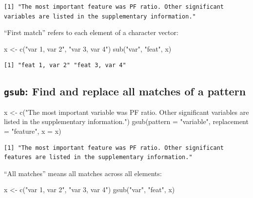 \documentclass[
]{book}
\newenvironment{Shaded}{\begin{snugshade}}{\end{snugshade}}
\newcommand{\AttributeTok}[1]{\textcolor[rgb]{0.77,0.63,0.00}{#1}}
\newcommand{\FunctionTok}[1]{\textcolor[rgb]{0.00,0.00,0.00}{#1}}
\newcommand{\NormalTok}[1]{#1}
\newcommand{\OtherTok}[1]{\textcolor[rgb]{0.56,0.35,0.01}{#1}}
\newcommand{\StringTok}[1]{\textcolor[rgb]{0.31,0.60,0.02}{#1}}
\begin{document}
\begin{verbatim}
[1] "The most important feature was PF ratio. Other significant variables are listed in the supplementary information."
\end{verbatim}

``First match'' refers to each element of a character vector:

\begin{Shaded}
\begin{Highlighting}[]
\NormalTok{x }\OtherTok{\textless{}{-}} \FunctionTok{c}\NormalTok{(}\StringTok{"var 1, var 2"}\NormalTok{, }\StringTok{"var 3, var 4"}\NormalTok{)}
\FunctionTok{sub}\NormalTok{(}\StringTok{"var"}\NormalTok{, }\StringTok{"feat"}\NormalTok{, x)}
\end{Highlighting}
\end{Shaded}

\begin{verbatim}
[1] "feat 1, var 2" "feat 3, var 4"
\end{verbatim}

\hypertarget{gsub-find-and-replace-all-matches-of-a-pattern}{%
\subsection{\texorpdfstring{\texttt{gsub}: Find and replace \textbf{all} matches of a pattern}{gsub: Find and replace all matches of a pattern}}\label{gsub-find-and-replace-all-matches-of-a-pattern}}

\begin{Shaded}
\begin{Highlighting}[]
\NormalTok{x }\OtherTok{\textless{}{-}} \FunctionTok{c}\NormalTok{(}\StringTok{"The most important variable was PF ratio. Other significant variables are listed in the supplementary information."}\NormalTok{)}
\FunctionTok{gsub}\NormalTok{(}\AttributeTok{pattern =} \StringTok{"variable"}\NormalTok{, }\AttributeTok{replacement =} \StringTok{"feature"}\NormalTok{, }\AttributeTok{x =}\NormalTok{ x)}
\end{Highlighting}
\end{Shaded}

\begin{verbatim}
[1] "The most important feature was PF ratio. Other significant features are listed in the supplementary information."
\end{verbatim}

``All matches'' means all matches across all elements:

\begin{Shaded}
\begin{Highlighting}[]
\NormalTok{x }\OtherTok{\textless{}{-}} \FunctionTok{c}\NormalTok{(}\StringTok{"var 1, var 2"}\NormalTok{, }\StringTok{"var 3, var 4"}\NormalTok{)}
\FunctionTok{gsub}\NormalTok{(}\StringTok{"var"}\NormalTok{, }\StringTok{"feat"}\NormalTok{, x)}
\end{Highlighting}
\end{Shaded}
\end{document}
